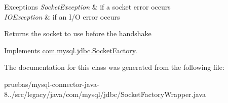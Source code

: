 \begin{DoxyExceptions}{Exceptions}
{\em Socket\+Exception} & if a socket error occurs \\
\hline
{\em I\+O\+Exception} & if an I/O error occurs\\
\hline
\end{DoxyExceptions}
\begin{DoxyReturn}{Returns}
the socket to use before the handshake 
\end{DoxyReturn}


Implements \mbox{\hyperlink{interfacecom_1_1mysql_1_1jdbc_1_1_socket_factory_aa9a78553a76681f49c734aaa3f8f126b}{com.\+mysql.\+jdbc.\+Socket\+Factory}}.



The documentation for this class was generated from the following file\+:\begin{DoxyCompactItemize}
\item 
pruebas/mysql-\/connector-\/java-\/8../src/legacy/java/com/mysql/jdbc/Socket\+Factory\+Wrapper.\+java\end{DoxyCompactItemize}
